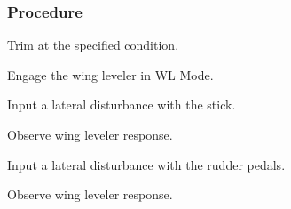 % 
% 
%
 \subsubsection*{Procedure}
 \begin{compactenum}
    \item Trim at the specified condition.
    \item Engage the wing leveler in WL Mode.
    \item Input a lateral disturbance with the stick.  
    \item Observe wing leveler response.
    \item Input a lateral disturbance with the rudder pedals.  
    \item Observe wing leveler response.
    \end{compactenum}
